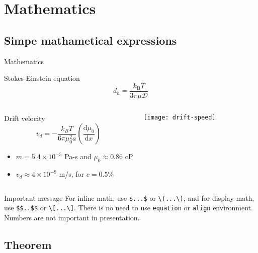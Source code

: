\documentclass{beamer}
\begin{document}
\section{Mathematics}
\SectionPage

\subsection{Simpe mathametical expressions}

\begin{frame}[fragile]{Mathematics}	
	\scriptsize	
	\begin{exampleblock}{Stokes-Einstein equation}
		$$d_h=\frac{k_\mathrm{B}T}{3\pi\mu\mathcal{D}}$$
		\hfill \cite{Selser76}
	\end{exampleblock}
 
	\begin{columns}[T] 
		\begin{block}{Drift velocity}
			$$v_d = -\frac{k_BT}{6\pi\mu_0^2a}\left(\frac{\mathrm{d}\mu_0}{\mathrm{d}x}\right)$$
			 \hfill \cite{Russel89}
			\begin{itemize}\scriptsize
				\item  $m = 5.4 \times10^{-5}$ Pa-s and $\mu_0 \approx 0.86$ cP
				\item  $v_d \approx 4\times10^{-9}$ m/s, for $c = 0.5\%$
			\end{itemize}
		\end{block}
		
		\texttt{[image: drift-speed]}		
	\end{columns}	
		
	\begin{alertblock}{Important message}
		 For inline math, use \verb|$...$|  or \verb|\(...\)|, and for display math, use \verb|$$..$$| or \verb|\[...\]|. There is no need to use \verb|equation| or \verb|align| environment. Numbers are not important in presentation.
	\end{alertblock}
\end{frame}

\subsection{Theorem}
\end{document}

